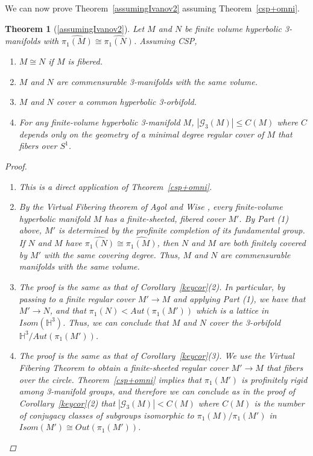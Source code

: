 \documentclass[12pt, reqno,oneside]{amsart}
\theoremstyle{definition}
\theoremstyle{plain}
\theoremstyle{TheoremNum}
\newtheorem{thmn}{Theorem}
\newcommand{\Hh}{{\mathbb H}}
\numberwithin{equation}{section}
\numberwithin{table}{section}
\begin{document}
We can now prove Theorem~\ref{assumingIvanov2} assuming Theorem~\ref{csp+omni}.
\smallbreak
\begin{thmn}[\ref{assumingIvanov2}]
    Let $M$ and $N$ be finite volume hyperbolic 3-manifolds with $\widehat{\pi_1(M)}\cong\widehat{\pi_1(N)}$. Assuming CSP,
    \begin{enumerate}
        \item $M\cong N$ if $M$ is fibered. 
        \item $M$ and $N$ are commensurable 3-manifolds with the same volume. 
        \item $M$ and $N$ cover a common hyperbolic 3-orbifold.
        \item For any finite-volume hyperbolic 3-manifold $M$, $|\mathcal{G}_3(M)|\leq C(M)$ where $C$ depends only on the geometry of a minimal degree regular cover of $M$ that fibers over $S^1$.
    \end{enumerate}
\begin{proof}
    \begin{enumerate}
        \item This is a direct application of Theorem~\ref{csp+omni}. 
        \item By the Virtual Fibering theorem of Agol and Wise \cite{AgolHaken}\cite{WiseHaken}, every finite-volume hyperbolic manifold $M$ has a finite-sheeted, fibered cover $M'$. By Part (1) above, $M'$ is determined by the profinite completion of its fundamental group. If $N$ and $M$ have $\widehat{\pi_1(N)}\cong\widehat{\pi_1(M)}$, then $N$ and $M$ are both finitely covered by $M'$ with the same covering degree. Thus, $M$ and $N$ are commensurable manifolds with the same volume. 
        \item The proof is the same as that of Corollary~\ref{keycor}(2). In particular, by passing to a finite regular cover $M'\to M$ and applying Part (1), we have that $M'\to N$, and that $\pi_1(N)<Aut(\pi_1(M'))$ which is a lattice in $Isom(\Hh^3)$. Thus, we can conclude that $M$ and $N$ cover the 3-orbifold $\Hh^3/Aut(\pi_1(M'))$.
        \item The proof is the same as that of Corollary~\ref{keycor}(3). We use the Virtual Fibering Theorem \cite{AgolHaken}\cite{WiseHaken} to obtain a finite-sheeted regular cover $M'\to M$ that fibers over the circle. Theorem~\ref{csp+omni} implies that $\pi_1(M')$ is profinitely rigid among 3-manifold groups, and therefore we can conclude as in the proof of Corollary~\ref{keycor}(2) that $|\mathcal{G}_3(M)|<C(M)$ where $C(M)$ is the number of conjugacy classes of subgroups isomorphic to $\pi_1(M)/\pi_1(M')$ in $Isom(M')\cong Out(\pi_1(M'))$.
    \end{enumerate}
\end{proof}
\end{thmn}
       
\end{document}

